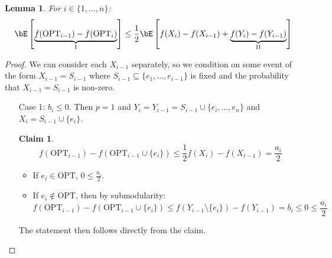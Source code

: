 \documentclass[11pt, a4paper]{article}
\newcommand{\mr}[1]{\mathrm{#1}}
\newcommand{\set}[1]{\{#1\}}
\newtheorem{lemma}[theorem]{Lemma}
\newtheorem*{claim}{Claim}
\theoremstyle{remark}
\theoremstyle{definition}
\begin{document}
\begin{lemma}\label{lemma:rand-double-greedy}
	For $i\in\set{1,\ldots,n}$:
	\[\bE\left[\underbrace{f(\mr{OPT}_{i-1})-f(\mr{OPT}_i)}_{\mr{I}}\right]\leq \frac{1}{2}\bE\left[f(X_i)-f(X_{i-1})+\underbrace{f(Y_i)-f(Y_{i-1})}_{\mr{II}}\right]\]
\end{lemma}
\begin{proof}
	We can consider each $X_{i-1}$ separately, so we condition on some event
	of the form $X_{i-1}=S_{i-1}$ where $S_{i-1}\subseteq\set{e_1,\ldots,e_{i-1}}$
	is fixed and the probability that $X_{i-1}=S_{i-1}$ is non-zero.
	\begin{enumerate}
		\item[Case 1:] $b_i\leq 0$. Then $p=1$ and $Y_i=Y_{i-1}=S_{i-1}\cup
			\set{e_i,\ldots,e_n}$ and $X_i=S_{i-1}\cup\set{e_i}$.

		\begin{claim}
			\[f(\mr{OPT}_{i-1})-f(\mr{OPT}_{i-1}\cup\set{e_i})\leq \frac{1}{2}f(X_i)-f(X_{i-1})=\frac{a_i}{2}\]
		\end{claim}
		\begin{itemize}
			\item If $e_i\in\mr{OPT}$, $0\leq \frac{a_i}{2}$.
			\item If $e_i\notin\mr{OPT}$, then by submodularity:
			\[f(\mr{OPT}_{i-1})-f(\mr{OPT}_{i-1}\cup\set{e_i})\leq f(Y_{i-1}\setminus\set{e_i})-f(Y_{i-1})=b_i\leq0\leq\frac{a_i}{2}\]
		\end{itemize}
		The statement then follows directly from the claim.


\end{enumerate}
\end{proof}
\end{document}
